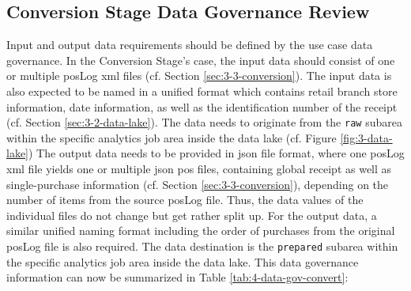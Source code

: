 \subsection{Conversion Stage Data Governance Review}
Input and output data requirements should be defined by the use case data governance. In the Conversion Stage's case, the input data should consist of one or multiple \ac{pos}Log \ac{xml} files (cf. Section \ref{sec:3-3-conversion}). The input data is also expected to be named in a unified format which contains retail branch store information, date information, as well as the identification number of the receipt (cf. Section \ref{sec:3-2-data-lake}). The data needs to originate from the \texttt{raw} subarea within the specific analytics job area inside the data lake (cf. Figure \ref{fig:3-data-lake}) The output data needs to be provided in \ac{json} file format, where one \ac{pos}Log \ac{xml} file yields one or multiple \ac{json} \ac{pos} files, containing global receipt as well as single-purchase information (cf. Section \ref{sec:3-3-conversion}), depending on the number of items from the source \ac{pos}Log file. Thus, the data values of the individual files do not change but get rather split up. For the output data, a similar unified naming format including the order of purchases from the original \ac{pos}Log file is also required. The data destination is the \texttt{prepared} subarea within the specific analytics job area inside the data lake. This data governance information can now be summarized in Table \ref{tab:4-data-gov-convert}:

